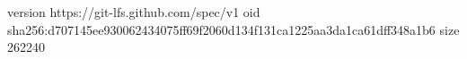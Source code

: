 version https://git-lfs.github.com/spec/v1
oid sha256:d707145ee930062434075ff69f2060d134f131ca1225aa3da1ca61dff348a1b6
size 262240
